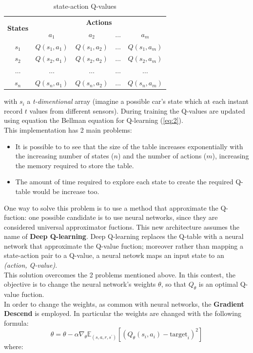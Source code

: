 \documentclass[14pt]{extarticle}
\def\pp{\vspace{10pt}\newline}
\def\ppn{\vspace{10pt}}
\begin{document}
\begin{flushleft}
\begin{table}[H]
\centering
\begin{tabular}{|c|c|c|c|c|}
\hline
\multirow{2}{*}{\textbf{States}} & \multicolumn{4}{c|}{\textbf{Actions}}                                \\ \cline{2-5} 
                                 & \textbf{$a_1$} & \textbf{$a_2$} & \textbf{$\dotso$} & \textbf{$a_m$} \\ \hline
$s_1$  				& $Q(s_1,a_1)$   				& $Q(s_1,a_2)$  				&  $\dotso$  				& $Q(s_1,a_m)$                \\ \hline
$s_2$  				& $Q(s_2,a_1)$   				& $Q(s_2,a_2)$  				&  $\dotso$  				& $Q(s_2,a_m)$                \\ \hline
$\dotso$      &  $\dotso$              	& $\dotso$              	&  $\dotso$              & $\dotso$              \\ \hline
$s_n$  				& $Q(s_n,a_1)$   				& $Q(s_n,a_2)$  				&  $\dotso$  				& $Q(s_n,a_m)$                \\ \hline
\end{tabular}
\caption{state-action Q-values}
\label{tab:my-table}
\end{table}
with $s_i$ a \emph{t-dimentional} array (imagine a possible car's state which at each instant record $t$ values from different sensors).
During training the Q-values are updated using equation the Bellman equation for Q-learning (\ref{eq:2}).
\\
This implementation has 2 main problems:
\begin{itemize}
\item It is possible to to see that the size of the table increases exponentially with the increasing number of states ($n$) and the number of actions ($m$), increasing the memory required to store the table.
\item The amount of time required to explore each state to create the required Q-table would be increase too.
\end{itemize}

\ppn
One way to solve this problem is to use a method that approximate the Q-fuction: one possible candidate is to use neural networks, since they are considered universal approximator fuctions. This new architecture assumes the name of \textbf{Deep Q-learning}. Deep Q-learning replaces the Q-table with a neural network that approximate the Q-value fuction; moreover rather than mapping a state-action pair to a Q-value, a neural netowk maps an input state to an \emph{(action, Q-value)}.
\\
This solution overcomes the 2 problems mentioned above.
\pp
In this contest, the objective is to change the neural network's weights $\theta$, so that $Q_{\theta}$ is an optimal Q-value fuction. \\
In order to change the weights, as common with neural networks, the \textbf{Gradient Descend} is employed. In particular the weights are changed with the following formula:
\[ \theta = \theta - \alpha\nabla_{\theta}\mathbb{E}_{(s,a,r,s^\prime)}[(Q_{\theta}(s_i,a_i) - \text{target}_i)^2]\]
where:


\end{flushleft}
\end{document}
